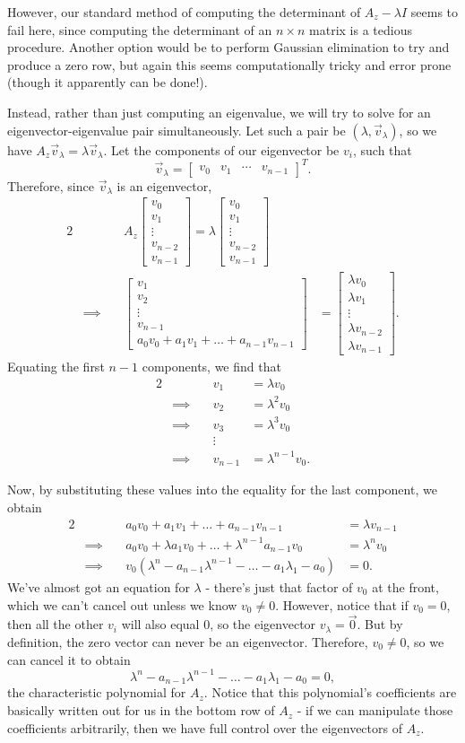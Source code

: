 \documentclass[letterpaper]{article}
\theoremstyle{remark}
\newcommand{\mat}[1]{\ensuremath{\begin{bmatrix}#1\end{bmatrix}}}
\newcommand{\eqn}[1]{\begin{alignat*}{2}#1\end{alignat*}}
\newcommand*{\thus}{&\implies\quad&}
\begin{document}
However, our standard method of computing the determinant of $A_z - \lambda I$ seems to fail here, since computing the determinant of an $n\times n$ matrix is a tedious procedure. Another option would be to perform Gaussian elimination to try and produce a zero row, but again this seems computationally tricky and error prone (though it apparently can be done!). 

Instead, rather than just computing an eigenvalue, we will try to solve for an eigenvector-eigenvalue pair simultaneously. Let such a pair be $(\lambda, \vec{v}_\lambda)$, so we have $A_z\vec{v}_\lambda = \lambda \vec{v}_\lambda$. Let the components of our eigenvector be $v_i$, such that
\[
    \vec{v}_\lambda = \mat{v_0 & v_1 & \cdots & v_{n-1}}^T.
\]
Therefore, since $\vec{v}_\lambda$ is an eigenvector,
\eqn{
    && A_z\mat{v_0 \\ v_1 \\ \vdots \\ v_{n-2} \\ v_{n-1}} = \lambda \mat{v_0 \\ v_1 \\ \vdots \\ v_{n-2} \\ v_{n-1}} \\
    \thus \mat{v_1 \\ v_2 \\ \vdots \\ v_{n-1} \\ a_0v_0 + a_1v_1 + \ldots + a_{n-1}v_{n-1} } &= \mat{\lambda v_0 \\ \lambda v_1 \\ \vdots \\ \lambda v_{n-2} \\ \lambda v_{n-1}}.
}
Equating the first $n - 1$ components, we find that
\eqn{
    && v_1 &= \lambda v_0 \\
    \thus v_2 &= \lambda^2 v_0 \\
    \thus v_3 &= \lambda^3 v_0 \\
    && \vdots \\
    \thus v_{n-1} &= \lambda^{n-1} v_0.
}

Now, by substituting these values into the equality for the last component, we obtain
\eqn{
    && a_0v_0 + a_1v_1 + \ldots + a_{n-1}v_{n-1} &= \lambda v_{n-1} \\
    \thus a_0v_0 + \lambda a_1v_0 + \ldots + \lambda^{n-1}a_{n-1}v_0 &= \lambda^nv_0 \\
    \thus v_0(\lambda^n - a_{n-1}\lambda^{n-1} - \ldots - a_1\lambda_1 - a_0) &= 0.
}
We've almost got an equation for $\lambda$ - there's just that factor of $v_0$ at the front, which we can't cancel out unless we know $v_0 \ne 0$. However, notice that if $v_0 = 0$, then all the other $v_i$ will also equal $0$, so the eigenvector $v_\lambda = \vec{0}$. But by definition, the zero vector can never be an eigenvector. Therefore, $v_0 \ne 0$, so we can cancel it to obtain
\[
    \lambda^n - a_{n-1}\lambda^{n-1} - \ldots - a_1\lambda_1 - a_0 = 0,
\]
the characteristic polynomial for $A_z$. Notice that this polynomial's coefficients are basically written out for us in the bottom row of $A_z$ - if we can manipulate those coefficients arbitrarily, then we have full control over the eigenvectors of $A_z$.
\end{document}
